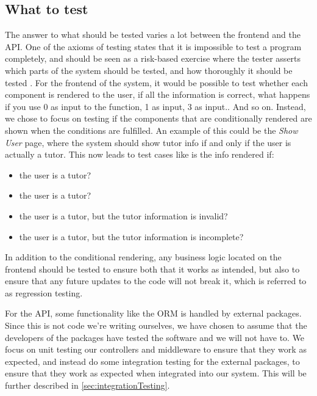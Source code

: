 \subsection{What to test}
The answer to what should be tested varies a lot between the frontend and the API.
One of the axioms of testing states that it is impossible to test a program completely, and should be seen as a risk-based exercise where the tester asserts which parts of the system should be tested, and how thoroughly it should be tested \cite{SoftwareTesting}.
For the frontend of the system, it would be possible to test whether each component is rendered to the user, if all the information is correct, what happens if you use 0 as input to the function, 1 as input, 3 as input.. And so on.
Instead, we chose to focus on testing if the components that are conditionally rendered are shown when the conditions are fulfilled.
An example of this could be the \textit{Show User} page, where the system should show tutor info if and only if the user is actually a tutor.
This now leads to test cases like is the info rendered if:
\begin{itemize}
    \item the user is a tutor?
    \item the user is a tutor?
    \item the user is a tutor, but the tutor information is invalid?
    \item the user is a tutor, but the tutor information is incomplete?
\end{itemize}

In addition to the conditional rendering, any business logic located on the frontend should be tested to ensure both that it works as intended, but also to ensure that any future updates to the code will not break it, which is referred to as regression testing.

For the API, some functionality like the ORM is handled by external packages. Since this is not code we're writing ourselves, we have chosen to assume that the developers of the packages have tested the software and we will not have to.
We focus on unit testing our controllers and middleware to ensure that they work as expected, and instead do some integration testing for the external packages, to ensure that they work as expected when integrated into our system. This will be further described in \autoref{sec:integrationTesting}.

